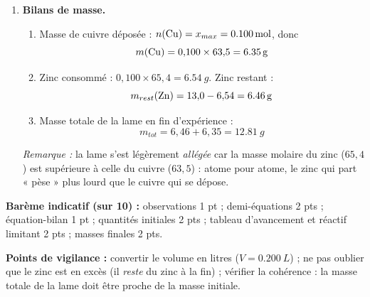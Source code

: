 \documentclass[11pt]{article}
\begin{document}
\begin{corrige}
\begin{enumerate}
\item \textbf{Bilans de masse.}
\begin{enumerate}
\item Masse de cuivre déposée : $n(\ce{Cu}) = x_{max} = \SI{0,100}{mol}$, donc
\[ m(\ce{Cu}) = 0{,}100 \times 63{,}5 = \SI{6,35}{g} \]
\item Zinc consommé : $0{,}100 \times 65{,}4 = \SI{6,54}{g}$. Zinc restant :
\[ m_{rest}(\ce{Zn}) = 13{,}0 - 6{,}54 = \SI{6,46}{g} \]
\item Masse totale de la lame en fin d'expérience :
\[ m_{tot} = 6{,}46 + 6{,}35 = \SI{12,81}{g} \]
\end{enumerate}
\emph{Remarque :} la lame s'est légèrement \emph{allégée} car la masse molaire du zinc ($65{,}4$) est supérieure à celle du cuivre ($63{,}5$) : atome pour atome, le zinc qui part « pèse » plus lourd que le cuivre qui se dépose.
\end{enumerate}

\textbf{Barème indicatif (sur 10) :} observations 1 pt ; demi-équations 2 pts ; équation-bilan 1 pt ; quantités initiales 2 pts ; tableau d'avancement et réactif limitant 2 pts ; masses finales 2 pts.

\textbf{Points de vigilance :} convertir le volume en litres ($V = \SI{0,200}{L}$) ; ne pas oublier que le zinc est en excès (il \emph{reste} du zinc à la fin) ; vérifier la cohérence : la masse totale de la lame doit être proche de la masse initiale.
\end{corrige}
\end{document}
